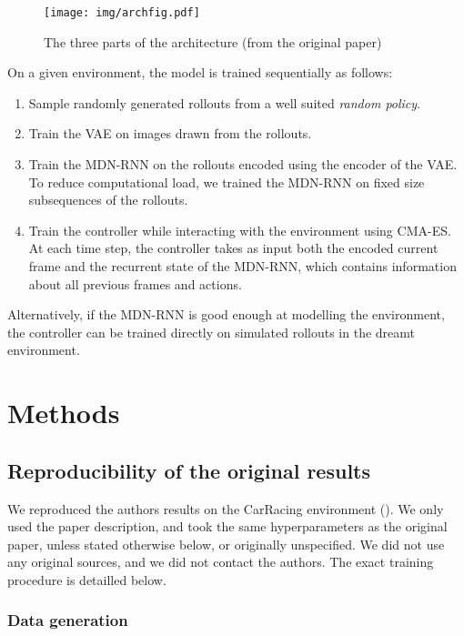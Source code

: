 \documentclass[10pt,a4paper,onecolumn]{article}
\newcommand{\tightlist}{%
  \setlength{\itemsep}{1pt}\setlength{\parskip}{0pt}\setlength{\parsep}{0pt}}
\begin{document}
\begin{figure}
\centering
\texttt{[image: img/archfig.pdf]}
\caption{The three parts of the architecture (from the original
paper)\label{fig:archi}}
\end{figure}

On a given environment, the model is trained sequentially as follows:

\begin{enumerate}
\def\labelenumi{\arabic{enumi}.}
\tightlist
\item
  Sample randomly generated rollouts from a well suited \emph{random
  policy}.
\item
  Train the VAE on images drawn from the rollouts.
\item
  Train the MDN-RNN on the rollouts encoded using the encoder of the
  VAE. To reduce computational load, we trained the MDN-RNN on fixed
  size subsequences of the rollouts.
\item
  Train the controller while interacting with the environment using
  CMA-ES. At each time step, the controller takes as input both the
  encoded current frame and the recurrent state of the MDN-RNN, which
  contains information about all previous frames and actions.
\end{enumerate}

Alternatively, if the MDN-RNN is good enough at modelling the
environment, the controller can be trained directly on simulated
rollouts in the dreamt environment.

\hypertarget{methods}{%
\section{Methods}\label{methods}}

\hypertarget{reproducibility-of-the-original-results}{%
\subsection{Reproducibility of the original
results}\label{reproducibility-of-the-original-results}}

We reproduced the authors results on the CarRacing environment
(\textcite{gym}). We only used the paper description, and took the same
hyperparameters as the original paper, unless stated otherwise below, or
originally unspecified. We did not use any original sources, and we did
not contact the authors. The exact training procedure is detailled
below.

\hypertarget{data-generation}{%
\subsubsection{Data generation}\label{data-generation}}
\end{document}
